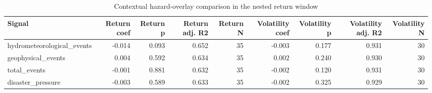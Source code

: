 \begin{table}
\caption{Contextual hazard-overlay comparison in the nested return window}
\label{tab:hazard_models}
\begin{tabular}{lrrrrrrrr}
\toprule
Signal & Return coef & Return p & Return adj. R2 & Return N & Volatility coef & Volatility p & Volatility adj. R2 & Volatility N \\
\midrule
hydrometeorological_events & -0.014 & 0.093 & 0.652 & 35 & -0.003 & 0.177 & 0.931 & 30 \\
geophysical_events & 0.004 & 0.592 & 0.634 & 35 & 0.002 & 0.240 & 0.930 & 30 \\
total_events & -0.001 & 0.881 & 0.632 & 35 & -0.002 & 0.120 & 0.931 & 30 \\
disaster_pressure & -0.003 & 0.589 & 0.633 & 35 & -0.002 & 0.325 & 0.929 & 30 \\
\bottomrule
\end{tabular}
\end{table}
